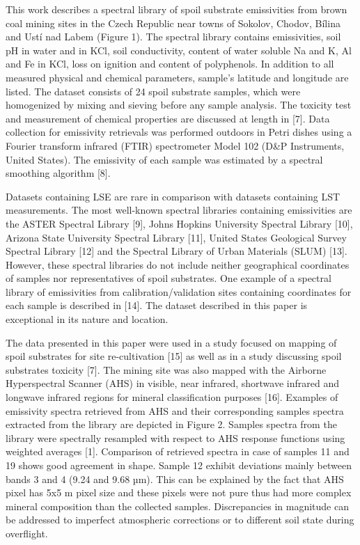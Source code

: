 This work describes a spectral library of spoil substrate emissivities from brown coal mining sites in the Czech Republic near towns of Sokolov, Chodov, Bílina and Ustí nad Labem (Figure 1). The spectral library contains emissivities, soil pH in water and in KCl, soil conductivity, content of water soluble Na and K, Al and Fe in KCl, loss on ignition and content of polyphenols. In addition to all measured physical and chemical parameters, sample’s latitude and longitude are listed. The dataset consists of 24 spoil substrate samples, which were homogenized by mixing and sieving before any sample analysis. The toxicity test and measurement of chemical properties are discussed at length in [7]. Data collection for emissivity retrievals was performed outdoors in Petri dishes using a Fourier transform infrared (FTIR) spectrometer Model 102 (D\&P Instruments, United States). The emissivity of each sample was estimated by a spectral smoothing algorithm [8].

Datasets containing LSE are rare in comparison with datasets containing LST measurements. The most well-known spectral libraries containing emissivities are the ASTER Spectral Library [9], Johns Hopkins University Spectral Library [10], Arizona State University Spectral Library [11], United States Geological Survey Spectral Library [12] and the Spectral Library of Urban Materials (SLUM) [13]. However, these spectral libraries do not include neither geographical coordinates of samples nor representatives of spoil substrates. One example of a spectral library of emissivities from calibration/validation sites containing coordinates for each sample is described in [14]. The dataset described in this paper is exceptional in its nature and location. 

The data presented in this paper were used in a study focused on mapping of spoil substrates for site re-cultivation [15] as well as in a study discussing spoil substrates toxicity [7]. The mining site was also mapped with the Airborne Hyperspectral Scanner (AHS) in visible, near infrared, shortwave infrared and longwave infrared regions for mineral classification purposes [16]. Examples of emissivity spectra retrieved from AHS and their corresponding samples spectra extracted from the library are depicted in Figure 2. Samples spectra from the library were spectrally resampled with respect to AHS response functions using weighted averages [1]. Comparison of retrieved spectra in case of samples 11 and 19 shows good agreement in shape. Sample 12 exhibit deviations mainly between bands 3 and 4 (9.24 and 9.68 µm). This can be explained by the fact that AHS pixel has 5x5 m pixel size and these pixels were not pure thus had more complex mineral composition than the collected samples. Discrepancies in magnitude can be addressed to imperfect atmospheric corrections or to different soil state during overflight.

